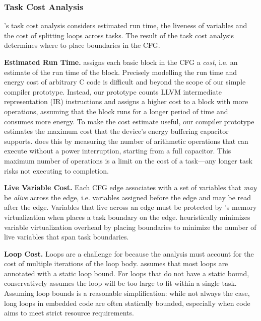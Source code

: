 
\subsubsection{Task Cost Analysis}

\sys's task cost analysis considers estimated run time, the liveness of
variables and the cost of splitting loops across tasks. The result of the task
cost analysis determines where to place boundaries in the CFG.
 
\textbf{Estimated Run Time.} \sys assigns each basic block in the CFG a
{\em cost}, i.e. an estimate of the run time of the block. Precisely
modelling the run time and energy cost of arbitrary C code is difficult and
beyond the scope of our simple compiler prototype. Instead, our prototype counts
LLVM intermediate representation (IR) instructions and assigns a higher cost to
a block with more operations, assuming that the block runs for a longer period
of time and consumes more energy. To make the cost estimate useful, our compiler prototype estimates the maximum cost that the device's energy buffering capacitor supports. \sys does this by measuring the number of arithmetic operations that can execute without a power interruption, starting from a full capacitor. This maximum number of operations is a limit on the cost of a task---any longer task risks not executing to completion.

\textbf{Live Variable Cost.} Each CFG edge associates with a set of
variables that {\em may} be {\em alive} across the edge, i.e. variables
assigned before the edge and may be read after the edge. Variables that live
across an edge must be protected by \sys's memory virtualization when
\sys places a task boundary on the edge. \sys heuristically minimizes variable
virtualization overhead by placing boundaries to minimize the number of
live variables that span task boundaries.

\textbf{Loop Cost.} Loops are a challenge for \sys because the analysis
must account for the cost of multiple iterations of the loop body. \sys assumes
that most loops are annotated with a static loop bound. For loops that do not
have a static bound, \sys conservatively assumes the loop will be too large to
fit within a single task. Assuming loop bounds is a reasonable simplification:
while not always the case, long loops in embedded code are often statically
bounded, especially when code aims to meet strict resource requirements. 

